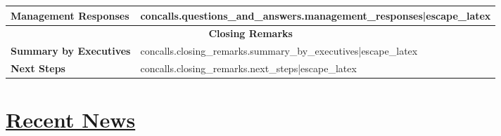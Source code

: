 \documentclass{article}
\begin{document}
\begin{table}[H]
\begin{tabularx}{\textwidth}{|m{5cm}|>{\raggedright\arraybackslash}X|}
            \hline
            \textbf{Management Responses} & {{ concalls.questions_and_answers.management_responses|escape_latex }} \\
            \hline
            \multicolumn{2}{|c|}{\textbf{Closing Remarks}} \\
            \hline
            \textbf{Summary by Executives} & {{ concalls.closing_remarks.summary_by_executives|escape_latex }} \\
            \hline
            \textbf{Next Steps} & {{ concalls.closing_remarks.next_steps|escape_latex }} \\
            \hline
        \end{tabularx}
    \end{table}
        
\section*{\underline{Recent News}}
\end{document}
